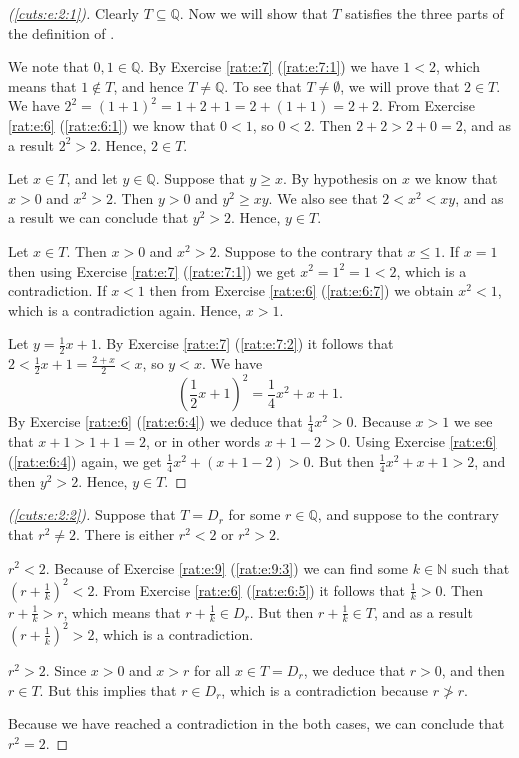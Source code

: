 \begin{proof}[(\ref{cuts:e:2:1})]
	Clearly $T \subseteq \mathbb{Q}$. Now we will show that $T$ satisfies the three parts of the definition of .

	 We note that $0, 1 \in \mathbb{Q}$. By Exercise \ref{rat:e:7} (\ref{rat:e:7:1}) we have $1 < 2$, which means that $1 \notin T$, and hence $T \not= \mathbb{Q}$. To see that $T \not= \emptyset$, we will prove that $2 \in T$. We have $2^2 = (1 + 1)^2 = 1 + 2 + 1 = 2 + (1 + 1) = 2 + 2$. From Exercise \ref{rat:e:6} (\ref{rat:e:6:1}) we know that $0 < 1$, so $0 < 2$. Then $2 + 2 > 2 + 0 = 2$, and as a result $2^2 > 2$. Hence, $2 \in T$.

	 Let $x \in T$, and let $y \in \mathbb{Q}$. Suppose that $y \geq x$. By hypothesis on $x$ we know that $x > 0$ and $x^2 > 2$. Then $y > 0$ and $y^2 \geq x y$. We also see that $2 < x^2 < x y$, and as a result we can conclude that $y^2 > 2$. Hence, $y \in T$.

	 Let $x \in T$. Then $x > 0$ and $x^2 > 2$. Suppose to the contrary that $x \leq 1$. If $x = 1$ then using Exercise \ref{rat:e:7} (\ref{rat:e:7:1}) we get $x^2 = 1^2 = 1 < 2$, which is a contradiction. If $x < 1$ then from Exercise \ref{rat:e:6} (\ref{rat:e:6:7}) we obtain $x^2 < 1$, which is a contradiction again. Hence, $x > 1$.

	Let $y = \frac{1}{2} x + 1$. By Exercise \ref{rat:e:7} (\ref{rat:e:7:2}) it follows that $2  < \frac{1}{2} x + 1  = \frac{2 + x}{2} < x$, so $y < x$. We have
	$$
		\left( \frac{1}{2} x + 1 \right)^2 = \frac{1}{4} x^2 + x + 1.
	$$
	By Exercise \ref{rat:e:6} (\ref{rat:e:6:4}) we deduce that $\frac{1}{4} x^2 > 0$. Because $x > 1$ we see that $x + 1 > 1 + 1 = 2$, or in other words $x + 1 - 2 > 0$. Using Exercise \ref{rat:e:6} (\ref{rat:e:6:4}) again, we get $\frac{1}{4} x^2 + (x + 1 - 2) > 0$. But then $\frac{1}{4} x^2 + x + 1 > 2$, and then $y^2 > 2$. Hence, $y \in T$.
\end{proof}

\begin{proof}[(\ref{cuts:e:2:2})]
	Suppose that $T = D_r$ for some $r \in \mathbb{Q}$, and suppose to the contrary that $r^2 \not= 2$. There is either $r^2 < 2$ or $r^2 > 2$.
	\begin{bycases}
		\item $r^2 < 2$. Because of Exercise \ref{rat:e:9} (\ref{rat:e:9:3}) we can find some $k \in \mathbb{N}$ such that $\left( r + \frac{1}{k} \right)^2 < 2$. From Exercise \ref{rat:e:6} (\ref{rat:e:6:5}) it follows that $\frac{1}{k} > 0$. Then ${r + \frac{1}{k} > r}$, which means that $r + \frac{1}{k} \in D_r$. But then $r + \frac{1}{k} \in T$, and as a result $\left( r + \frac{1}{k} \right)^2 > 2$, which is a contradiction.
		\item $r^2 > 2$. Since $x > 0$ and $x > r$ for all $x \in T=D_r$, we deduce that $r > 0$, and then $r \in T$. But this implies that $r \in D_r$, which is a contradiction because $r \not> r$.
	\end{bycases}

	Because we have reached a contradiction in the both cases, we can conclude that ${r^2 = 2}$.
\end{proof}


